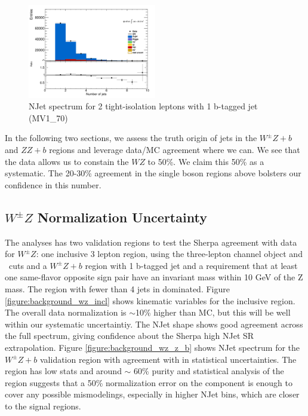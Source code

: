 \begin{figure}[!htbp]
\centering \includegraphics[width=0.5\textwidth]{figs/wz/ZbVR}
\caption{NJet spectrum for 2 tight-isolation leptons with 1 b-tagged jet (MV1\_70)} 
\label{figure:background_wz_zb}
\end{figure} 

In the following two sections, we assess the truth origin of jets in the $W^{\pm}Z+b$ and $ZZ+b$ regions and leverage data/MC agreement where we can. We see that the data allows us to constain the $WZ$ to 50\%. We claim this 50\% as a systematic. The 20-30\% agreement in the single boson regions above bolsters our confidence in this number. 

\subsection{$W^{\pm}Z$ Normalization Uncertainty} 
The \tth analyses has two validation regions to test the Sherpa agreement with data for $W^{\pm}Z$: one inclusive 3 lepton region, using the three-lepton channel object and \pt\ cuts and a $W^{\pm}Z+b$ region with 1 b-tagged jet and a requirement that at least one same-flavor opposite sign pair have an invariant mass within 10 GeV of the Z mass. The region with fewer than 4 jets in \WZ dominated. Figure \ref{figure:background_wz_incl} shows kinematic variables for the inclusive region. The overall data normalization is $\sim$10\% higher than MC, but this will be well within our systematic uncertaintiy. The NJet shape shows good agreement across the full spectrum, giving confidence about the Sherpa high NJet SR extrapolation. Figure \ref{figure:background_wz_z_b} shows NJet spectrum for the $W^{\pm}Z+b$ validation region with agreement with in statistical uncertainties. The region has low stats and around $\sim$ 60\% purity and statistical analysis of the region suggests that a 50\% normalization error on the \WZ component is enough to cover any possible mismodelings, especially in higher NJet bins, which are closer to the signal regions.  

